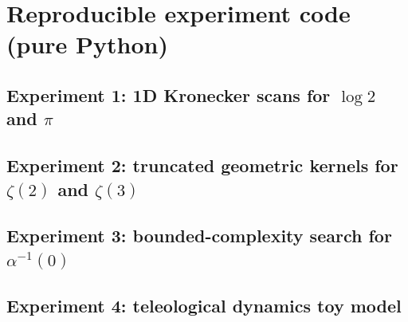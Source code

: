 
\section{Reproducible experiment code (pure Python)}
\label{app:code}

\subsection{Experiment 1: 1D Kronecker scans for \texorpdfstring{$\log 2$}{log 2} and \texorpdfstring{$\pi$}{pi}}
\label{app:code_exp1}


\subsection{Experiment 2: truncated geometric kernels for \texorpdfstring{$\zeta(2)$}{zeta(2)} and \texorpdfstring{$\zeta(3)$}{zeta(3)}}
\label{app:code_exp2}


\subsection{Experiment 3: bounded-complexity search for \texorpdfstring{$\alpha^{-1}(0)$}{alpha inverse}}
\label{app:code_exp3}


\subsection{Experiment 4: teleological dynamics toy model}
\label{app:code_exp4}



